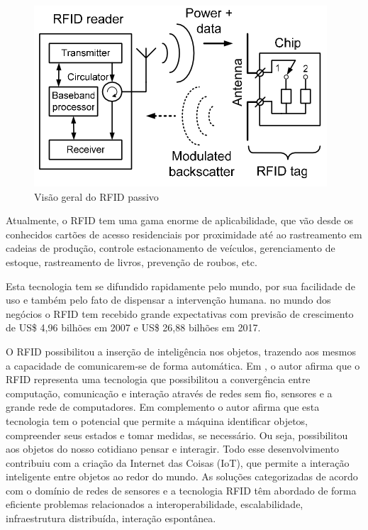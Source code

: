 \begin{figure}[h]
\begin{centering}
\includegraphics[width=0.5\linewidth]{Imagens/Cap_2/rfid}
\par\end{centering}
\caption{Visão geral do RFID passivo \cite{Chawla2007}\label{fig:rfid}}
\end{figure}

Atualmente, o RFID tem uma gama enorme de aplicabilidade, que vão
desde os conhecidos cartões de acesso residenciais por proximidade
até ao rastreamento em cadeias de produção, controle estacionamento
de veículos, gerenciamento de estoque, rastreamento de livros, prevenção
de roubos, etc\cite{Roberts2006}.

Esta tecnologia tem se difundido rapidamente pelo mundo, por sua facilidade
de uso e também pelo fato de dispensar a intervenção humana\cite{zhu2012review}.
no mundo dos negócios o RFID tem recebido grande expectativas com
previsão de crescimento de US\$ 4,96 bilhões em 2007 e US\$ 26,88
bilhões em 2017\cite{RFIDForecasts2007}.

O RFID possibilitou a inserção de inteligência nos objetos, trazendo
aos mesmos a capacidade de comunicarem-se de forma automática\cite{Khoo2010}.
Em \cite{Khoo2010}, o autor afirma que o RFID representa uma tecnologia
que possibilitou a convergência entre computação, comunicação e interação
através de redes sem fio, sensores e a grande rede de computadores.
Em complemento o autor afirma que esta tecnologia tem o potencial
que permite a máquina identificar objetos, compreender seus estados
e tomar medidas, se necessário. Ou seja, possibilitou aos objetos
do nosso cotidiano pensar e interagir. Todo esse desenvolvimento contribuiu
com a criação da Internet das Coisas (IoT), que permite a interação
inteligente entre objetos ao redor do mundo. As soluções categorizadas
de acordo com o domínio de redes de sensores e a tecnologia RFID têm
abordado de forma eficiente problemas relacionados a interoperabilidade,
escalabilidade, infraestrutura distribuída, interação espontânea\cite{Luckenbach2005}. 

